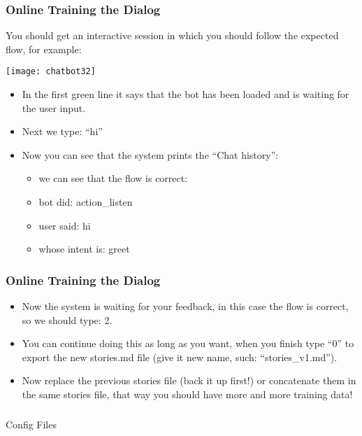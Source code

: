  \begin{frame}[fragile]\frametitle{Online Training the Dialog}
You should get an interactive session in which you should follow the expected flow, for example:
 
\begin{center}
\texttt{[image: chatbot32]}
\end{center}

\begin{itemize}
\item In the first green line it says that the bot has been loaded and is waiting for the user input.
\item Next we type: ``hi''
\item Now you can see that the system prints the ``Chat history'':
\begin{itemize}
\item we can see that the flow is correct:
\item bot did: action\_listen
\item user said: hi
\item whose intent is: greet
\end{itemize}
\end{itemize}

\end{frame}

 \begin{frame}[fragile]\frametitle{Online Training the Dialog}
\begin{itemize}
\item Now the system is waiting for your feedback, in this case the flow is correct, so we should type: 2.
\item You can continue doing this as long as you want, when you finish type ``0'' to export the new stories.md file (give it new name, such: ``stories\_v1.md'').
\item Now replace the previous stories file (back it up first!) or concatenate them in the same stories file, that way you should have more and more training data!
\end{itemize}

\end{frame}



\begin{frame}[fragile]\frametitle{}
\begin{center}
{\Large Config Files}

\end{center}
\end{frame}

